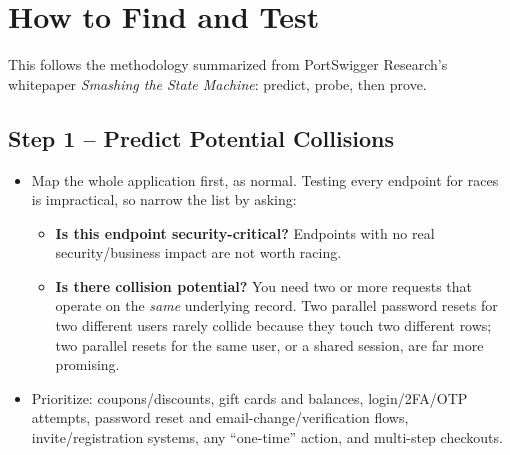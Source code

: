 \documentclass[11pt]{article}
\begin{document}
\section{How to Find and Test}
This follows the methodology summarized from PortSwigger Research's whitepaper \textit{Smashing the State Machine}: predict, probe, then prove.
 
\subsection{Step 1 -- Predict Potential Collisions}
\begin{itemize}[leftmargin=1.2em]
  \item Map the whole application first, as normal. Testing every endpoint for races is impractical, so narrow the list by asking:
  \begin{itemize}
    \item \textbf{Is this endpoint security-critical?} Endpoints with no real security/business impact are not worth racing.
    \item \textbf{Is there collision potential?} You need two or more requests that operate on the \emph{same} underlying record. Two parallel password resets for two different users rarely collide because they touch two different rows; two parallel resets for the same user, or a shared session, are far more promising.
  \end{itemize}
  \item Prioritize: coupons/discounts, gift cards and balances, login/2FA/OTP attempts, password reset and email-change/verification flows, invite/registration systems, any ``one-time'' action, and multi-step checkouts.
\end{itemize}
 
\end{document}
